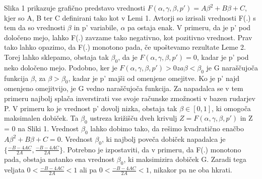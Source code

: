 \documentclass{acm_proc_article-sp}
\begin{document}
Slika 1 prikazuje grafično predstavo vrednosti $ F(\alpha, \gamma, \beta, p') = A\beta^2 + B\beta + C $, kjer so A, B ter C definirani tako kot v Lemi 1. Avtorji so izrisali vrednosti F(.) s tem da so vrednosti $\beta$ in p' variabile, $\alpha$ pa ostaja enak. V primeru, da je p' pod določeno mejo, lahko F(.) zavzame tako negativno, kot pozitivno vrednost. Prav tako lahko opazimo, da F(.) monotono pada, če upoštevamo rezultate Leme 2. Torej lahko sklepamo, obstaja tak $\beta_0$, da je $ F(\alpha, \gamma, \beta, p') = 0 $, kadar je p' pod neko določeno mejo. Podobno, ker je $ F(\alpha, \gamma, \beta, p') > 0 za \beta < \beta_0 $ je G naraščujoča funkcija $\beta$, za $\beta > \beta_0$, kadar je p' majši od omenjene omejitve. Ko je p' najd omenjeno omejitvijo, je G vedno naraščujoča funkcija. Za napadalca se v tem primeru najbolj splača inverstirati vse svoje računske zmožnosti v bazen rudarjev P. V primeru ko je vrednost p' dovolj nizka, obstaja tak $\beta \in [0, 1]$, ki omogoča maksimalen dobiček. Ta $\beta_0$ ustreza križišču dveh krivulj $Z = F(\alpha, \gamma, \beta, p')$ in Z = 0 na Sliki 1. Vrednost $\beta_0$ lahko dobimo tako, da rešimo kvadratično enačbo $A\beta^2 + B\beta + C = 0$. Vrednost $\beta_0$, ki najbolj poveča dobiček napadalca je $\{\frac{-B - 4AC}{2A}, \frac{-B -4AC}{2A}\}$.
\newline
Potrebno je izpostaviti, da v primeru, da F(.) monotono pada, obstaja natanko ena vrednost $\beta_0$, ki maksimizira dobiček G. Zaradi tega veljata $0 < \frac{-B-4AC}{2A} < 1$ ali pa $0 < \frac{-B - 4 AC}{2A} < 1$, nikakor pa ne oba hkrati.
\end{document}
